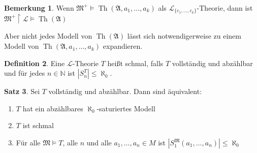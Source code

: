 \documentclass[12pt,parskip=full]{scrartcl}
\newcommand{\setN}{\mathbb{N}}
\newcommand{\abs}[1]{{\left| #1 \right|}}
\theoremstyle{definition}
\newtheorem{theorem}{Satz}[section]
\newtheorem{definition}[theorem]{Definition}
\newtheorem{remark}[theorem]{Bemerkung}
\begin{document}
	\begin{remark}
		Wenn $\mathfrak{M}^+ \models \operatorname{Th}(\mathfrak{A}, a_1, \dots, a_k)$ als $\mathcal{L}_{\{ c_1, \dots, c_k \}}$-Theorie, dann ist $\mathfrak{M}^+ \upharpoonright \mathcal{L} \models \operatorname{Th}(\mathfrak{A})$
		
		Aber nicht jedes Modell von $\operatorname{Th}(\mathfrak{A})$ lässt sich notwendigerweise zu einem Modell von $\operatorname{Th}(\mathfrak{A}, a_1, \dots, a_k)$ expandieren.
	\end{remark}

	\begin{definition}
		Eine $\mathcal{L}$-Theorie $T$ heißt schmal, falls $T$ vollständig und abzählbar und für jedes $n \in \setN$ ist $\abs{S_n^T} \leq \aleph_0$.
	\end{definition}

	\begin{theorem}
		Sei $T$ vollständig und abzählbar. Dann sind äquivalent:
		\begin{enumerate}
			\item $T$ hat ein abzählbares $\aleph_0$-saturiertes Modell
			\item $T$ ist schmal
			\item Für alle $\mathfrak{M} \models T$, alle $n$ und alle $a_1, \dots, a_n \in M$ ist $\abs{S_1^\mathfrak{M}(a_1, \dots, a_n)} \leq \aleph_0$
		\end{enumerate}
	\end{theorem}
\end{document}
